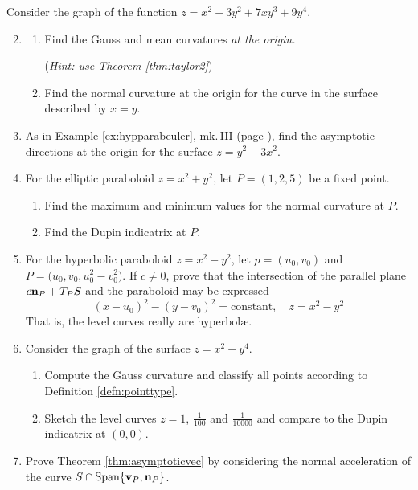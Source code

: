 \begin{exercises}{}{}
	\exstart Consider the graph of the function $z=x^2-3y^2+7xy^3+9y^4$.
	\begin{enumerate}\setcounter{enumi}{1}
	  \item[]\begin{enumerate}
	  	\item Find the Gauss and mean curvatures \emph{at the origin.}\par
	  	(\emph{Hint: use Theorem \ref{thm:taylor2}})
	  	\item Find the normal curvature at the origin for the curve in the surface described by $x=y$.
	  \end{enumerate}
	  
	  
	  \item As in Example \ref*{ex:hypparabeuler}, mk.\,III (page \pageref{pg:hypparbeuler}), find the asymptotic directions at the origin for the surface $z=y^2-3x^2$.
	  
	  
	  \item For the elliptic paraboloid $z=x^2+y^2$, let $P=(1,2,5)$ be a fixed point.
	  \begin{enumerate}
	    \item Find the maximum and minimum values for the normal curvature at $P$.
	    \item Find the Dupin indicatrix at $P$.
	  \end{enumerate}
	  
	  
	  \item For the hyperbolic paraboloid $z=x^2-y^2$, let $p=(u_0,v_0)$ and $P=\bigl(u_0,v_0,u_0^2-v_0^2\bigr)$. If $c\neq 0$, prove that the intersection of the parallel plane $c{\mathbf{n}}_P+T_PS$ and the paraboloid may be expressed
	  \[
	  	(x-u_0)^2-(y-v_0)^2=\text{constant},\quad z=x^2-y^2
	  \]
	  That is, the level curves really are hyperbolæ.
	
	
		\item Consider the graph of the surface $z=x^2+y^4$.
		\begin{enumerate}
		  \item Compute the Gauss curvature and classify all points according to Definition \ref{defn:pointtype}.
		  \item Sketch the level curves $z=1$, $\frac 1{100}$ and $\frac 1{10000}$ and compare to the Dupin indicatrix at $(0,0)$.
		\end{enumerate}
		

		
		\item Prove Theorem \ref{thm:asymptoticvec} by considering the normal acceleration of the curve $S\cap\operatorname{Span}\{{\mathbf{v}}_P,{\mathbf{n}}_P\}$.
		
	\end{enumerate}
\end{exercises}


